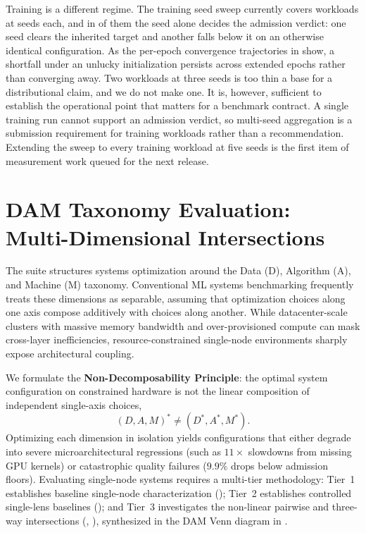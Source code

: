 \documentclass[10pt,twocolumn]{article}
\begin{document}
Training is a different regime. The training seed sweep currently covers \TrainingSeedWorkloads{} workloads at \TrainingSeedCount{} seeds each, and in \TrainingSeedFlipping{} of them the seed alone decides the admission verdict: one seed clears the inherited target and another falls below it on an otherwise identical configuration. As the per-epoch convergence trajectories in  show, a shortfall under an unlucky initialization persists across extended epochs rather than converging away. Two workloads at three seeds is too thin a base for a distributional claim, and we do not make one. It is, however, sufficient to establish the operational point that matters for a benchmark contract. A single training run cannot support an admission verdict, so multi-seed aggregation is a submission requirement for training workloads rather than a recommendation. Extending the sweep to every training workload at five seeds is the first item of measurement work queued for the next release.

\section{DAM Taxonomy Evaluation: Multi-Dimensional Intersections}
\label{sec:dam_eval}

The suite structures systems optimization around the Data (D), Algorithm (A), and Machine (M) taxonomy. Conventional ML systems benchmarking frequently treats these dimensions as separable, assuming that optimization choices along one axis compose additively with choices along another. While datacenter-scale clusters with massive memory bandwidth and over-provisioned compute can mask cross-layer inefficiencies, resource-constrained single-node environments sharply expose architectural coupling. 

We formulate the \textbf{Non-Decomposability Principle}: the optimal system configuration on constrained hardware is not the linear composition of independent single-axis choices,
\begin{equation}
(D, A, M)^* \ne (D^*, A^*, M^*).
\end{equation}
Optimizing each dimension in isolation yields configurations that either degrade into severe microarchitectural regressions (such as $11\times$ slowdowns from missing GPU kernels) or catastrophic quality failures ($9.9\%$ drops below admission floors). Evaluating single-node systems requires a multi-tier methodology: Tier~1 establishes baseline single-node characterization (); Tier~2 establishes controlled single-lens baselines (); and Tier~3 investigates the non-linear pairwise and three-way intersections (, ), synthesized in the DAM Venn diagram in .
\end{document}
